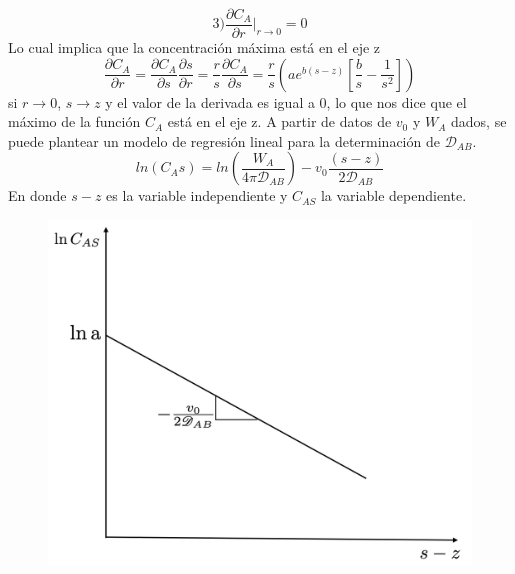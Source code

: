  \begin{equation*}
     3) \frac{\partial C_A}{\partial r}|_{r\rightarrow0}=0
 \end{equation*}
 Lo cual implica que la concentración máxima está en el eje z
 \begin{equation*}
    \frac{\partial C_A}{\partial r}=\frac{\partial C_A}{\partial s}\frac{\partial s}{\partial r}=\frac{r}{s}\frac{\partial C_A}{\partial s}=\frac{r}{s}(ae^{b(s-z)}[\frac{b}{s}-\frac{1}{s^2}])
 \end{equation*}
 si $r\rightarrow0$, $s\rightarrow z$ y el valor de la derivada es igual a 0, lo que nos dice que el máximo de la función $C_A$ está en el eje z.
 A partir de datos de $v_0$ y $W_A$ dados, se puede plantear un modelo de regresión lineal para la determinación de $\mathscr{D}_{AB}$.
 \begin{equation*}
     ln(C_As)=ln(\frac{W_A}{4\pi \mathscr{D}_{AB}})-v_0\frac{(s-z)}{2\mathscr{D}_{AB}}
 \end{equation*}
 En donde $s-z$ es la variable independiente y $C_{AS}$ la variable dependiente.

\begin{figure}[H]
    \centering
    \includegraphics[width=0.5\linewidth]{Capitulo2/Fig_A2.png}
\end{figure}
 
